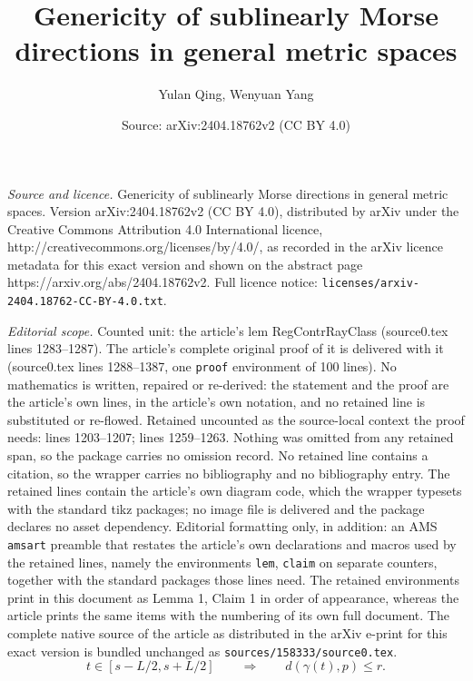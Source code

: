 \documentclass[10pt,a4paper]{amsart}
\title{Genericity of sublinearly Morse directions in general metric spaces}
\author{Yulan Qing, Wenyuan Yang}
\date{Source: arXiv:2404.18762v2 (CC BY 4.0)}
\begin{document}
\maketitle

\noindent\emph{Source and licence.} Genericity of sublinearly Morse directions in general metric spaces. Version arXiv:2404.18762v2 (CC BY 4.0), distributed by arXiv under the Creative Commons Attribution 4.0 International licence, http://creativecommons.org/licenses/by/4.0/, as recorded in the arXiv licence metadata for this exact version and shown on the abstract page https://arxiv.org/abs/2404.18762v2. Full licence notice: \texttt{licenses/arxiv-2404.18762-CC-BY-4.0.txt}.\par\smallskip

\noindent\textit{Editorial scope.} Counted unit: the article's lem RegContrRayClass (source0.tex lines 1283--1287). The article's complete original proof of it is delivered with it (source0.tex lines 1288--1387, one \texttt{proof} environment of 100 lines). No mathematics is written, repaired or re-derived: the statement and the proof are the article's own lines, in the article's own notation, and no retained line is substituted or re-flowed.  Retained uncounted as the source-local context the proof needs: lines 1203--1207; lines 1259--1263.  Nothing was omitted from any retained span, so the package carries no omission record.  No retained line contains a citation, so the wrapper carries no bibliography and no bibliography entry.  The retained lines contain the article's own diagram code, which the wrapper typesets with the standard tikz packages; no image file is delivered and the package declares no asset dependency.  Editorial formatting only, in addition: an AMS \texttt{amsart} preamble that restates the article's own declarations and macros used by the retained lines, namely the environments \texttt{lem}, \texttt{claim} on separate counters, together with the standard packages those lines need.  The retained environments print in this document as Lemma 1, Claim 1 in order of appearance, whereas the article prints the same items with the numbering of its own full document.  The complete native source of the article as distributed in the arXiv e-print for this exact version is bundled unchanged as \texttt{sources/158333/source0.tex}.
\begin{equation}\label{rclosetopEQ}
t \in [s-L/2 , s+L/2]
\qquad\Longrightarrow \qquad
d(\gamma(t), p) \leq r.    
\end{equation}
\end{document}
